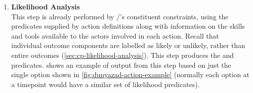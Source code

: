 \begin{enumerate}[leftmargin=1.4em]
\item %
\textbf{Likelihood Analysis} \\
%
This step is already performed by \dunyazad/'s constituent constraints, using the  predicates supplied by action definitions along with information on the skills and tools available to the actors involved in each action. 
%
Recall that individual outcome components are labelled as likely or unlikely, rather than entire outcomes (\cref{sec:cp-likelihood-analysis}).
%
This step produces the  and  predicates.
%
 shows an example of output from this step based on just the single option shown in \cref{fig:dunyazad-action-example} (normally each option at a timepoint would have a similar set of likelihood predicates).


\end{enumerate}
